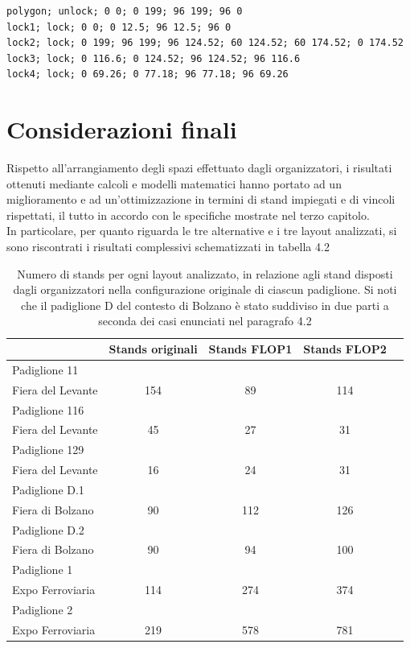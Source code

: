 \documentclass[12pt,a4paper,openright,twoside]{report}
\begin{document}
\begin{verbatim}
polygon; unlock; 0 0; 0 199; 96 199; 96 0
lock1; lock; 0 0; 0 12.5; 96 12.5; 96 0				
lock2; lock; 0 199; 96 199; 96 124.52; 60 124.52; 60 174.52; 0 174.52
lock3; lock; 0 116.6; 0 124.52; 96 124.52; 96 116.6		
lock4; lock; 0 69.26; 0 77.18; 96 77.18; 96 69.26
\end{verbatim}
\section{Considerazioni finali}
Rispetto all'arrangiamento degli spazi effettuato dagli organizzatori, i risultati ottenuti mediante calcoli e modelli matematici hanno portato ad un miglioramento e ad un'ottimizzazione in termini di stand impiegati e di vincoli rispettati, il tutto in accordo con le specifiche mostrate nel terzo capitolo.\\
In particolare, per quanto riguarda le tre alternative e i tre layout analizzati, si sono riscontrati i risultati complessivi schematizzati in tabella 4.2\\
\begin{table}[!h]
\begin{center}
\begin{tabular}{|l|c|c|c|c|}
\hline
 & \textbf{Stands originali} & \textbf{Stands FLOP1} & \textbf{Stands FLOP2} \\
\hline
\hline
Padiglione 11\\Fiera del Levante & 154 & 89 & 114 \\
\hline
Padiglione 116\\Fiera del Levante & 45 & 27 & 31 \\
\hline
Padiglione 129\\Fiera del Levante & 16 & 24 & 31 \\
\hline
Padiglione D.1\\Fiera di Bolzano & 90 & 112 & 126  \\
\hline
Padiglione D.2\\Fiera di Bolzano & 90 & 94 & 100  \\
\hline
Padiglione 1\\Expo Ferroviaria & 114 & 274 & 374 \\
\hline
Padiglione 2\\Expo Ferroviaria & 219 & 578 & 781 \\
\hline
\hline
\end{tabular}
\end{center}
\caption{Numero di stands per ogni layout analizzato, in relazione agli stand disposti dagli organizzatori nella configurazione originale di ciascun padiglione. Si noti che il padiglione D del contesto di Bolzano \`{e} stato suddiviso in due parti a seconda dei casi enunciati nel paragrafo 4.2}
\label{tab:table}
\end{table}
\end{document}
